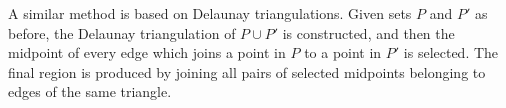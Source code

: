 \documentclass[preprint,5p,times,twocolumn]{elsarticle}
\begin{document}
A similar method \cite{Avi-04} is based on Delaunay triangulations. Given sets $P$ and $P'$ as before, the Delaunay triangulation of $P \cup P'$ is constructed, and then the midpoint of every edge which joins a point in $P$ to a point in $P'$ is selected. The final region is produced by joining all pairs of selected midpoints belonging to edges of the same triangle.

%
%
%
%
\end{document}
